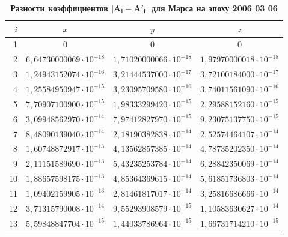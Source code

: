\begin{table}[p!]
%
\small \centering
\caption{\bf Разности коэффициентов $\boldsymbol{|A_i-A'_i|}$ для Марса на эпоху 2006 03 06}
\vspace{-3mm}
\begin{tabular}{r|c|c|c}
\hline	
\footnotesize $i$ & \footnotesize 	$x$	&\footnotesize 	$y$	&\footnotesize 	$z$	\\
\hline
\rule{0mm}{12pt}%
1	&$	0	$&$	0	$&$	0	$\\
2	&$	6,64730000069\cdot 10^{-18}	$&$	1,71020000066\cdot 10^{-18}	$&$	1,97970000018\cdot 10^{-18}	 $\\
3	&$	1,24943152074\cdot 10^{-16}	$&$	3,21444537000\cdot 10^{-17}	$&$	3,72100184000\cdot 10^{-17}	 $\\
4	&$	1,25584950947\cdot 10^{-15}	$&$	3,23095709580\cdot 10^{-16}	$&$	3,74011561090\cdot 10^{-16}	 $\\
5	&$	7,70907100900\cdot 10^{-15}	$&$	1,98333299420\cdot 10^{-15}	$&$	2,29588152160\cdot 10^{-15}	 $\\
6	&$	3,09948562970\cdot 10^{-14}	$&$	7,97412827970\cdot 10^{-15}	$&$	9,23075137750\cdot 10^{-15}	 $\\
7	&$	8,48090139040\cdot 10^{-14}	$&$	2,18190382838\cdot 10^{-14}	$&$	2,52574464107\cdot 10^{-14}	 $\\
8	&$	1,60748872917\cdot 10^{-13}	$&$	4,13562857385\cdot 10^{-14}	$&$	4,78735202350\cdot 10^{-14}	 $\\
9	&$	2,11151589690\cdot 10^{-13}	$&$	5,43235253784\cdot 10^{-14}	$&$	6,28842350069\cdot 10^{-14}	 $\\
10	&$	1,88657598175\cdot 10^{-13}	$&$	4,85364369615\cdot 10^{-14}	$&$	5,61851736803\cdot 10^{-14}	$\\
11	&$	1,09402159905\cdot 10^{-13}	$&$	2,81461817017\cdot 10^{-14}	$&$	3,25816686666\cdot 10^{-14}	$\\
12	&$	3,71315790008\cdot 10^{-14}	$&$	9,55293908579\cdot 10^{-15}	$&$	1,10583630627\cdot 10^{-14}	$\\
13	&$	5,59848847704\cdot 10^{-15}	$&$	1,44033786964\cdot 10^{-15}	$&$	1,66731714210\cdot 10^{-15}	$\\
\hline
\end{tabular}
%

\bigskip


\end{table}
